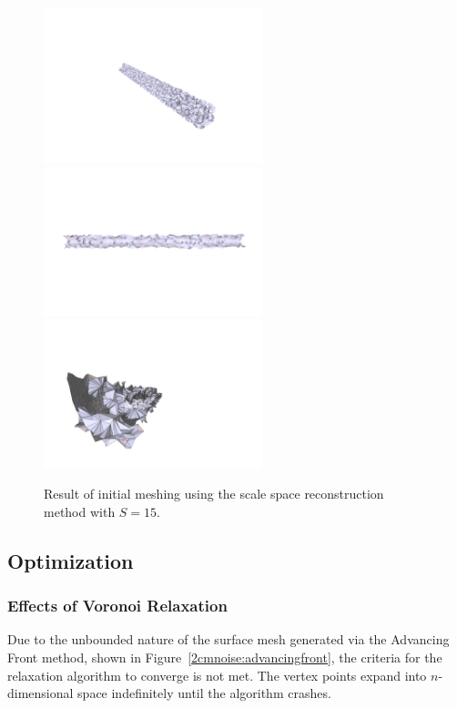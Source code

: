 \documentclass[12pt]{drexelthesis}
\let\Oldsubsection\subsection
\renewcommand{\subsection}{\FloatBarrier\Oldsubsection}
\let\Oldsubsubsection\subsubsection
\renewcommand{\subsubsection}{\FloatBarrier\Oldsubsubsection}
\begin{document}
\begin{figure}[!ht]
	
	\centering
		\includegraphics[trim={4in 2in 1.5in 3in},clip,width=2.5in]{simulated-lab-scan/2cmnoise/2cmmesh/scalespace1500.png}
		\includegraphics[width=2.5in]{simulated-lab-scan/2cmnoise/2cmmesh/scalespace1501.png}
		\includegraphics[width=2.5in]{simulated-lab-scan/2cmnoise/2cmmesh/scalespace1502.png}
		\caption[Initial meshing using a scale space reconstruction with $S = 15$]{\centering  Result of initial meshing using the scale space reconstruction method with $S = 15$.}
		\label{2cmnoise:scalespace15}
\end{figure}

\subsection{Optimization}
\subsubsection{Effects of Voronoi Relaxation}

Due to the unbounded nature of the surface mesh generated via the Advancing Front method, shown in Figure~\ref{2cmnoise:advancingfront}, the criteria for the relaxation algorithm to converge is not met. The vertex points expand into $n$-dimensional space indefinitely until the algorithm crashes. %
\end{document}
